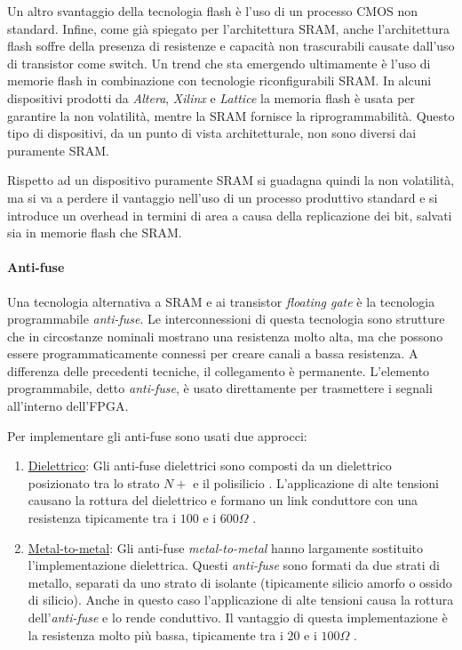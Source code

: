 Un altro svantaggio della tecnologia flash è l'uso di un processo CMOS non standard. Infine, come già spiegato per l'architettura SRAM, anche l'architettura flash soffre della presenza di resistenze e capacità non trascurabili causate dall'uso di transistor come switch. Un trend che sta emergendo ultimamente è l'uso di memorie flash in combinazione con tecnologie riconfigurabili SRAM. In alcuni dispositivi prodotti da \textit{Altera}, \textit{Xilinx} e \textit{Lattice} la memoria flash è usata per garantire la non volatilità, mentre la SRAM fornisce la riprogrammabilità. Questo tipo di dispositivi, da un punto di vista architetturale, non sono diversi dai puramente SRAM.

Rispetto ad un dispositivo puramente SRAM si guadagna quindi la non volatilità, ma si va a perdere il vantaggio nell'uso di un  processo produttivo standard e si introduce un overhead in termini di area a causa della replicazione dei bit, salvati sia in memorie flash che SRAM.

\paragraph{Anti-fuse}
Una tecnologia alternativa a SRAM e ai transistor \textit{floating gate} è la tecnologia programmabile \textit{anti-fuse}. Le interconnessioni di questa tecnologia sono strutture che in circostanze nominali mostrano una resistenza molto alta, ma che possono essere programmaticamente connessi per creare canali a bassa resistenza. A differenza delle precedenti tecniche, il collegamento è permanente. L'elemento programmabile, detto \textit{anti-fuse}, è usato direttamente per trasmettere i segnali all'interno dell'FPGA.

Per implementare gli anti-fuse sono usati due approcci:
\begin{enumerate}
	\item \underline{Dielettrico}: Gli anti-fuse dielettrici sono composti da un dielettrico posizionato tra lo strato $N+$ e il polisilicio \cite{32929}. L'applicazione di alte tensioni causano la rottura del dielettrico e formano un link conduttore con una resistenza tipicamente tra i $100$ e i $600\Omega$ \cite{231343}.
	\item \underline{Metal-to-metal}: Gli anti-fuse \textit{metal-to-metal} hanno largamente sostituito l'implementazione dielettrica. Questi \textit{anti-fuse} sono formati da due strati di metallo, separati da uno strato di isolante (tipicamente silicio amorfo o ossido di silicio). Anche in questo caso l'applicazione di alte tensioni causa la rottura dell'\textit{anti-fuse} e lo rende conduttivo. Il vantaggio di questa implementazione è la resistenza molto più bassa, tipicamente tra i $20$ e i $100 \Omega$ \cite{584227}.
\end{enumerate}

